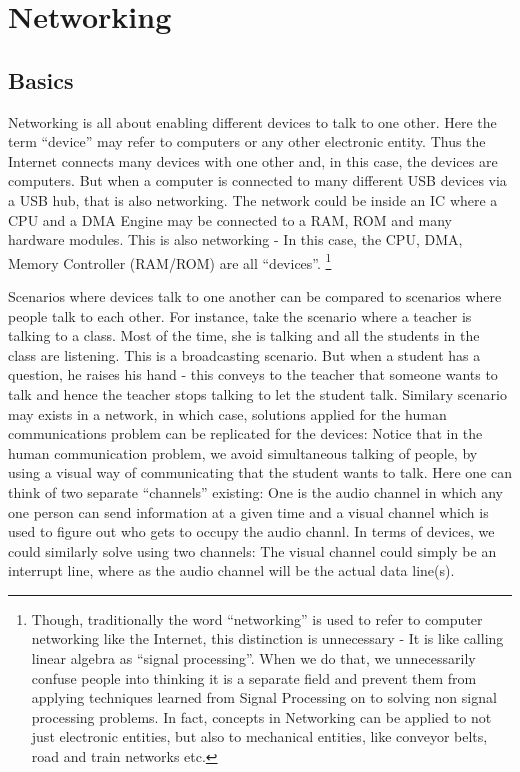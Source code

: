 \part{Networking}
\chapter{Basics}
Networking is all about enabling different devices to talk to one other. Here the term ``device'' may refer to computers or any other electronic entity. Thus the Internet connects many devices with one other and, in this case, the devices are computers. But when a computer is connected to many different USB devices via a USB hub, that is also networking. The network could be inside an IC where a CPU and a DMA Engine may be connected to a RAM, ROM and many hardware modules. This is also networking - In this case, the CPU, DMA, Memory Controller (RAM/ROM) are all ``devices''. \footnote{Though, traditionally the word ``networking'' is used to refer to computer networking like the Internet, this distinction is unnecessary - It is like calling linear algebra as ``signal processing''. When we do that, we unnecessarily confuse people into thinking it is a separate field and prevent them from applying techniques learned from Signal Processing on to solving non signal processing problems. In fact, concepts in Networking can be applied to not just electronic entities, but also to mechanical entities, like conveyor belts, road and train networks etc.}

Scenarios where devices talk to one another can be compared to scenarios where people talk to each other. For instance, take the scenario where a teacher is talking to a class. Most of the time, she is talking and all the students in the class are listening. This is a broadcasting scenario. But when a student has a question, he raises his hand - this conveys to the teacher that someone wants to talk and hence the teacher stops talking to let the student talk. Similary scenario may exists in a network, in which case, solutions applied for the human communications problem can be replicated for the devices: Notice that in the human communication problem, we avoid simultaneous talking of people, by using a visual way of communicating that the student wants to talk. Here one can think of two separate ``channels'' existing: One is the audio channel in which any one person can send information at a given time and a visual channel which is used to figure out who gets to occupy the audio channl. In terms of devices, we could similarly solve using two channels: The visual channel could simply be an interrupt line, where as the audio channel will be the actual data line(s). 

